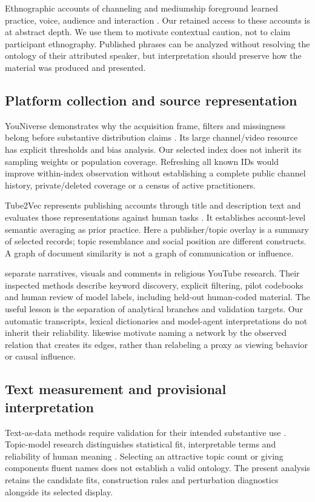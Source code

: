 Ethnographic accounts of channeling and mediumship foreground learned practice, voice, audience and interaction \citep{klinoron2014channel,tomlinson2019medium}. Our retained access to these accounts is at abstract depth. We use them to motivate contextual caution, not to claim participant ethnography. Published phrases can be analyzed without resolving the ontology of their attributed speaker, but interpretation should preserve how the material was produced and presented.

\subsection{Platform collection and source representation}
YouNiverse demonstrates why the acquisition frame, filters and missingness belong before substantive distribution claims \citep{ribeiro2021youniverse}. Its large channel/video resource has explicit thresholds and bias analysis. Our selected index does not inherit its sampling weights or population coverage. Refreshing all known IDs would improve within-index observation without establishing a complete public channel history, private/deleted coverage or a census of active practitioners.

Tube2Vec represents publishing accounts through title and description text and evaluates those representations against human tasks \citep{boesinger2024tube2vec}. It establishes account-level semantic averaging as prior practice. Here a publisher/topic overlay is a summary of selected records; topic resemblance and social position are different constructs. A graph of document similarity is not a graph of communication or influence.

\citet{chen2026digital} separate narratives, visuals and comments in religious YouTube research. Their inspected methods describe keyword discovery, explicit filtering, pilot codebooks and human review of model labels, including held-out human-coded material. The useful lesson is the separation of analytical branches and validation targets. Our automatic transcripts, lexical dictionaries and model-agent interpretations do not inherit their reliability. \citet{ota2025pathways} likewise motivate naming a network by the observed relation that creates its edges, rather than relabeling a proxy as viewing behavior or causal influence.

\subsection{Text measurement and provisional interpretation}
Text-as-data methods require validation for their intended substantive use \citep{grimmer2013text}. Topic-model research distinguishes statistical fit, interpretable terms and reliability of human meaning \citep{chang2009reading,doogan2021twaddle,hoyle2021incoherence,schroeder2025reliability}. Selecting an attractive topic count or giving components fluent names does not establish a valid ontology. The present analysis retains the candidate fits, construction rules and perturbation diagnostics alongside its selected display.

